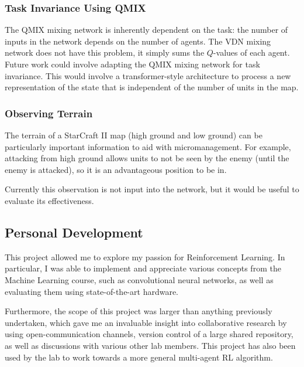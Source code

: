 \subsubsection{Task Invariance Using QMIX}

The QMIX mixing network is inherently dependent on the task: the number of inputs in the network depends on the number of agents. The VDN mixing network does not have this problem, it simply sums the $Q$-values of each agent. Future work could involve adapting the QMIX mixing network for task invariance. This would involve a transformer-style architecture to process a new representation of the state that is independent of the number of units in the map.


\subsubsection{Observing Terrain}

The terrain of a StarCraft II map (high ground and low ground) can be particularly important information to aid with micromanagement. For example, attacking from high ground allows units to not be seen by the enemy (until the enemy is attacked), so it is an advantageous position to be in.

Currently this observation is not input into the network, but it would be useful to evaluate its effectiveness.


\subsection{Personal Development}
This project allowed me to explore my passion for Reinforcement Learning. In particular, I was able to implement and appreciate various concepts from the Machine Learning course, such as convolutional neural networks, as well as evaluating them using state-of-the-art hardware.

Furthermore, the scope of this project was larger than anything previously undertaken, which gave me an invaluable insight into collaborative research by using open-communication channels, version control of a large shared repository, as well as discussions with various other lab members. This project has also been used by the lab to work towards a more general multi-agent RL algorithm.